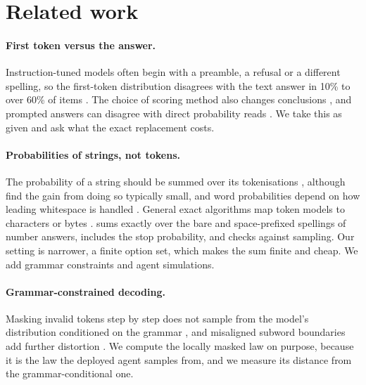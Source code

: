 \section{Related work}
\label{sec:related}

\paragraph{First token versus the answer.}
Instruction-tuned models often begin with a preamble, a refusal or a different spelling, so the first-token distribution disagrees with the text answer in 10\% to over 60\% of items \citep{wang2024myanswer,wang2024lookattext,lyu2024beyond,cappelletti2025prefilling,guo2026scoring}.
The choice of scoring method also changes conclusions \citep{tsvilodub2024scoring}, and prompted answers can disagree with direct probability reads \citep{hu2023prompting}.
We take this as given and ask what the exact replacement costs.

\paragraph{Probabilities of strings, not tokens.}
The probability of a string should be summed over its tokenisations \citep{cao2021marginal,geh2024signal}, although \citet{chirkova2023marginalize} find the gain from doing so typically small, and word probabilities depend on how leading whitespace is handled \citep{pimentel2024word,oh2024whitespace}.
General exact algorithms map token models to characters or bytes \citep{vieira2025characters,phan2025bytes}.
\citet{ansari2026numbers} sums exactly over the bare and space-prefixed spellings of number answers, includes the stop probability, and checks against sampling.
Our setting is narrower, a finite option set, which makes the sum finite and cheap.
We add grammar constraints and agent simulations.

\paragraph{Grammar-constrained decoding.}
Masking invalid tokens step by step does not sample from the model's distribution conditioned on the grammar \citep{park2024grammar}, and misaligned subword boundaries add further distortion \citep{beurerkellner2024guiding}.
We compute the locally masked law on purpose, because it is the law the deployed agent samples from, and we measure its distance from the grammar-conditional one.

